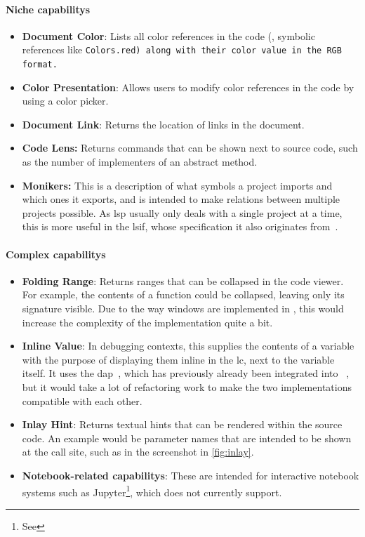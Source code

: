 \documentclass[../thesis]{subfiles}
\begin{document}
\paragraph{Niche \glspl{capability}}
\begin{itemize}
	\item \textbf{Document Color}: Lists all color references in the code (\eg, symbolic references like \tt{Colors.red}) along with their color value in the RGB format.
	\item \textbf{Color Presentation}: Allows users to modify color references in the code by using a color picker.
	\item \textbf{Document Link}: Returns the location of links in the document.
	\item \textbf{Code Lens:} Returns commands that can be shown next to source code, such as the number of implementers of an abstract method.
	\item \textbf{Monikers:} This is a description of what symbols a project imports and which ones it exports, and is intended to make relations between multiple projects possible.
	      As \gls{lsp} usually only deals with a single project at a time, this is more useful in the \gls{lsif}, whose specification it also originates from~\cite{lsif}.
\end{itemize}
\paragraph{Complex \glspl{capability}}
\begin{itemize}
	\item \textbf{Folding Range}: Returns \glspl{range} that can be collapsed in the code viewer.
	      For example, the contents of a function could be collapsed, leaving only its signature visible.
	      Due to the way \glspl{window} are implemented in \SEE{}, this would increase the complexity of the implementation quite a bit.
	\item \textbf{Inline Value}: In debugging contexts, this supplies the contents of a variable with the purpose of displaying them inline in the \gls{lc}, next to the variable itself.
	      It uses the \gls{dap}~\cite{dap}, which has previously already been integrated into \SEE{}~\cite{rohlfing2022}, but it would take a lot of refactoring work to make the two implementations compatible with each other.
	\item \textbf{Inlay Hint}: Returns textual hints that can be rendered within the source code.
	      An example would be parameter names that are intended to be shown at the call site, such as in the screenshot in \cref{fig:inlay}.
	\item \textbf{Notebook-related \glspl{capability}}: These are intended for interactive notebook systems such as Jupyter\footnote{See }, which \SEE{} does not currently support.
\end{itemize}
\end{document}
